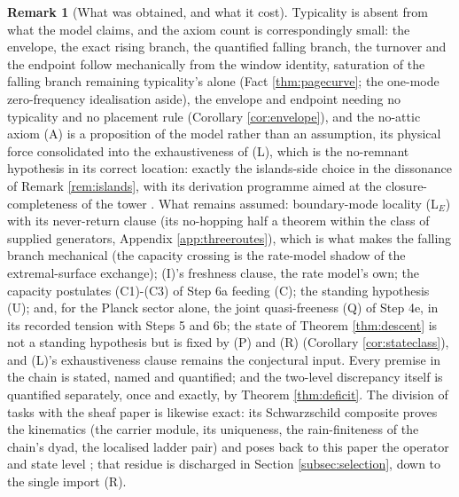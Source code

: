 \documentclass[11pt]{article}
\theoremstyle{definition}
\newtheorem{remark}[theorem]{Remark}
\begin{document}
\begin{remark}[What was obtained, and what it cost]\label{rem:cost}
Typicality is absent from what the model claims, and the axiom count is correspondingly small: the envelope, the exact rising branch, the quantified falling branch, the turnover and the endpoint follow mechanically from the window identity, saturation of the falling branch remaining typicality's alone (Fact \ref{thm:pagecurve}; the one-mode zero-frequency idealisation aside), the envelope and endpoint needing no typicality and no placement rule (Corollary \ref{cor:envelope}), and the no-attic axiom (A) is a proposition of the model rather than an assumption, its physical force consolidated into the exhaustiveness of (L), which is the no-remnant hypothesis in its correct location: exactly the islands-side choice in the dissonance of Remark \ref{rem:islands}, with its derivation programme aimed at the closure-completeness of the tower \cite[Cor.~6.2]{ButlerT3}. What remains assumed: boundary-mode locality (L$_E$) with its never-return clause (its no-hopping half a theorem within the class of supplied generators, Appendix \ref{app:threeroutes}), which is what makes the falling branch mechanical (the capacity crossing is the rate-model shadow of the extremal-surface exchange); (I)'s freshness clause, the rate model's own; the capacity postulates (C1)-(C3) of Step 6a feeding (C); the standing hypothesis (U); and, for the Planck sector alone, the joint quasi-freeness (Q) of Step 4e, in its recorded tension with Steps 5 and 6b; the state of Theorem \ref{thm:descent} is not a standing hypothesis but is fixed by (P) and (R) (Corollary \ref{cor:stateclass}), and (L)'s exhaustiveness clause remains the conjectural input. Every premise in the chain is stated, named and quantified; and the two-level discrepancy itself is quantified separately, once and exactly, by Theorem \ref{thm:deficit}. The division of tasks with the sheaf paper is likewise exact: its Schwarzschild composite proves the kinematics (the carrier module, its uniqueness, the rain-finiteness of the chain's dyad, the localised ladder pair) and poses back to this paper the operator and state level \cite[\S 8.9]{ButlerT4}; that residue is discharged in Section \ref{subsec:selection}, down to the single import (R).
\end{remark}
\end{document}

